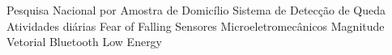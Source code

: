 \begin{acronym}[ACRONYM] 

 { Pesquisa Nacional por Amostra de Domicílio }
 {Sistema de Detecção de Queda}
 {Atividades diárias}
 {Fear of Falling}
 { Sensores Microeletromecânicos }
 { Magnitude Vetorial }
 {Bluetooth Low Energy}
    
\end{acronym}